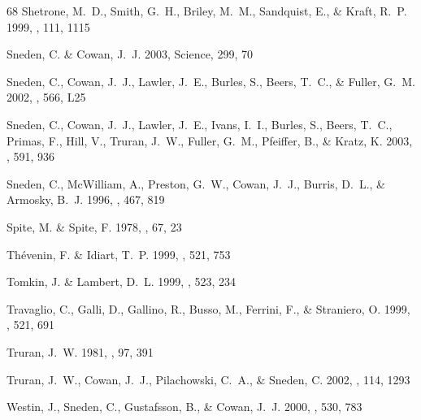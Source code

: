 \documentclass[12pt,preprint]{aastex}
\begin{document}
{\begin{thebibliography}{68}
{Shetrone}, M.~D., {Smith}, G.~H., {Briley}, M.~M., {Sandquist}, E., \&
  {Kraft}, R.~P. 1999, \pasp, 111, 1115

{Sneden}, C. \& {Cowan}, J.~J. 2003, Science, 299, 70

{Sneden}, C., {Cowan}, J.~J., {Lawler}, J.~E., {Burles}, S., {Beers}, T.~C., \&
  {Fuller}, G.~M. 2002, \apjl, 566, L25

{Sneden}, C., {Cowan}, J.~J., {Lawler}, J.~E., {Ivans}, I.~I., {Burles}, S.,
  {Beers}, T.~C., {Primas}, F., {Hill}, V., {Truran}, J.~W., {Fuller}, G.~M.,
  {Pfeiffer}, B., \& {Kratz}, K. 2003, \apj, 591, 936

{Sneden}, C., {McWilliam}, A., {Preston}, G.~W., {Cowan}, J.~J., {Burris},
  D.~L., \& {Armosky}, B.~J. 1996, \apj, 467, 819

{Spite}, M. \& {Spite}, F. 1978, \aap, 67, 23

{Th{\' e}venin}, F. \& {Idiart}, T.~P. 1999, \apj, 521, 753

{Tomkin}, J. \& {Lambert}, D.~L. 1999, \apj, 523, 234

{Travaglio}, C., {Galli}, D., {Gallino}, R., {Busso}, M., {Ferrini}, F., \&
  {Straniero}, O. 1999, \apj, 521, 691

{Truran}, J.~W. 1981, \aap, 97, 391

{Truran}, J.~W., {Cowan}, J.~J., {Pilachowski}, C.~A., \& {Sneden}, C. 2002,
  \pasp, 114, 1293

{Westin}, J., {Sneden}, C., {Gustafsson}, B., \& {Cowan}, J.~J. 2000, \apj,
  530, 783


\end{thebibliography}}
\end{document}
